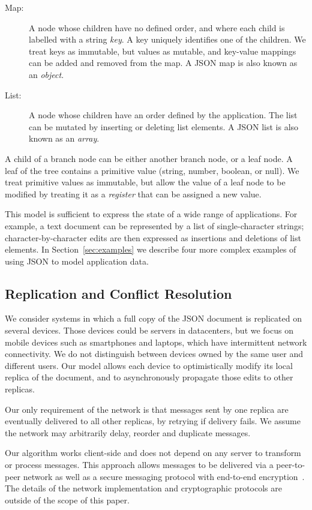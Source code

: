 \documentclass[10pt,journal,compsoc]{IEEEtran}
\begin{document}
\begin{description}
\item[Map:] A node whose children have no defined order, and where each child is labelled with a string \emph{key}. A key uniquely identifies one of the children. We treat keys as immutable, but values as mutable, and key-value mappings can be added and removed from the map. A JSON map is also known as an \emph{object}.
\item[List:] A node whose children have an order defined by the application. The list can be mutated by inserting or deleting list elements. A JSON list is also known as an \emph{array}.
\end{description}

A child of a branch node can be either another branch node, or a leaf node. A leaf of the tree contains a primitive value (string, number, boolean, or null). We treat primitive values as immutable, but allow the value of a leaf node to be modified by treating it as a \emph{register} that can be assigned a new value.

This model is sufficient to express the state of a wide range of applications. For example, a text document can be represented by a list of single-character strings; character-by-character edits are then expressed as insertions and deletions of list elements. In Section~\ref{sec:examples} we describe four more complex examples of using JSON to model application data.

\subsection{Replication and Conflict Resolution}\label{sec:intro-replication}

We consider systems in which a full copy of the JSON document is replicated on several devices. Those devices could be servers in datacenters, but we focus on mobile devices such as smartphones and laptops, which have intermittent network connectivity. We do not distinguish between devices owned by the same user and different users. Our model allows each device to optimistically modify its local replica of the document, and to asynchronously propagate those edits to other replicas.

Our only requirement of the network is that messages sent by one replica are eventually delivered to all other replicas, by retrying if delivery fails. We assume the network may arbitrarily delay, reorder and duplicate messages.

Our algorithm works client-side and does not depend on any server to transform or process messages. This approach allows messages to be delivered via a peer-to-peer network as well as a secure messaging protocol with end-to-end encryption~\cite{Unger:2015kg}. The details of the network implementation and cryptographic protocols are outside of the scope of this paper.
\end{document}
